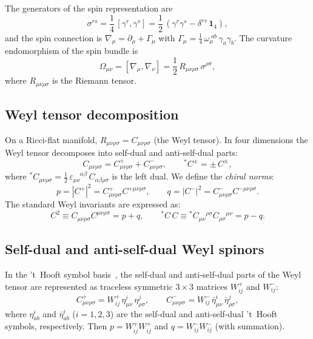 \documentclass[12pt,a4paper]{article}
\theoremstyle{definition}
\theoremstyle{remark}
\newcommand{\Weylsq}{C_{\mu\nu\rho\sigma}C^{\mu\nu\rho\sigma}}
\newcommand{\dualCC}{\!{}^{\ast}\!C_{\mu\nu}{}^{\rho\sigma}C_{\rho\sigma}{}^{\mu\nu}}
\begin{document}
The generators of the spin representation are
\begin{equation}\label{eq:sigma}
  \sigma^{rs} = \frac{1}{4}\,[\gamma^r, \gamma^s]
  = \frac{1}{2}\,(\gamma^r \gamma^s - \delta^{rs}\,\mathbf{1}_4),
\end{equation}
and the spin connection is
$\nabla_\mu = \partial_\mu + \Gamma_\mu$ with
$\Gamma_\mu = \frac{1}{4}\,\omega_\mu^{\;ab}\,\gamma_a\gamma_b$.
The curvature endomorphism of the spin bundle is
\begin{equation}\label{eq:Omega}
  \Omega_{\mu\nu} = [\nabla_\mu, \nabla_\nu]
  = \frac{1}{2}\,R_{\mu\nu\rho\sigma}\,\sigma^{\rho\sigma},
\end{equation}
where $R_{\mu\nu\rho\sigma}$ is the Riemann tensor.

\subsection{Weyl tensor decomposition}

On a Ricci-flat manifold, $R_{\mu\nu\rho\sigma} = C_{\mu\nu\rho\sigma}$
(the Weyl tensor).  In four dimensions the Weyl tensor decomposes into
self-dual and anti-self-dual parts:
\begin{equation}
  C_{\mu\nu\rho\sigma} = C^+_{\mu\nu\rho\sigma} + C^-_{\mu\nu\rho\sigma},
  \qquad
  {}^{\ast}\!C^{\pm} = \pm\, C^{\pm},
\end{equation}
where ${}^{\ast}\!C_{\mu\nu\rho\sigma}
= \frac{1}{2}\,\varepsilon_{\mu\nu}^{\phantom{\mu\nu}\alpha\beta}\,
C_{\alpha\beta\rho\sigma}$ is the left dual.  We define the \emph{chiral
norms}:
\begin{equation}\label{eq:pq-def}
  p = |C^+|^2 = C^+_{\mu\nu\rho\sigma} C^{+\mu\nu\rho\sigma}, \qquad
  q = |C^-|^2 = C^-_{\mu\nu\rho\sigma} C^{-\mu\nu\rho\sigma}.
\end{equation}
The standard Weyl invariants are expressed as:
\begin{equation}\label{eq:weyl-pq}
  C^2 \equiv \Weylsq = p + q, \qquad
  {}^{\ast}\!C\,C \equiv \dualCC = p - q.
\end{equation}

\subsection{Self-dual and anti-self-dual Weyl spinors}

In the 't~Hooft symbol basis~\cite{tHooft:1976snw}, the self-dual and
anti-self-dual parts of the Weyl tensor are represented as traceless symmetric
$3 \times 3$ matrices $W^+_{ij}$ and $W^-_{ij}$:
\begin{equation}
  C^+_{\mu\nu\rho\sigma} = W^+_{ij}\,\eta^i_{\mu\nu}\,\eta^j_{\rho\sigma},
  \qquad
  C^-_{\mu\nu\rho\sigma} = W^-_{ij}\,\bar\eta^i_{\mu\nu}\,\bar\eta^j_{\rho\sigma},
\end{equation}
where $\eta^i_{ab}$ and $\bar\eta^i_{ab}$ ($i = 1,2,3$) are the
self-dual and anti-self-dual 't~Hooft symbols, respectively.  Then
$p = W^+_{ij}W^+_{ij}$ and $q = W^-_{ij}W^-_{ij}$ (with summation).
\end{document}
